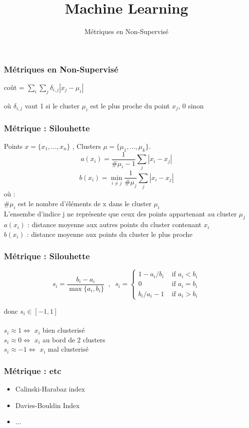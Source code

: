 \documentclass{formation}
\title{Machine Learning}
\subtitle{Métriques en Non-Supervisé}
\begin{document}
\maketitle

\begin{frame}
  \frametitle{Métriques en Non-Supervisé}
  \begin{center}
    coût = $\sum_i \sum_j \delta_{i,j}\left| x_j - \mu_i \right|$
  \end{center}
  où $\delta_{i,j}$ vaut 1 si le cluster $\mu_i$ est le plus proche du point $x_j$, 0 sinon
\end{frame}

\begin{frame}
  \frametitle{Métrique : Silouhette}
  Points $x = \{x_1, \dotsc, x_n\}$ , Clusters $\mu = \{\mu_1, \dotsc, \mu_k\}$. \\
  \[
  \boxed{a(x_i) = \frac{1}{\#\mu_i-1}\sum_j |x_i - x_j|}
  \]
  \[
  \boxed{b(x_i) = \min_{i \neq j} \frac{1}{\#\mu_j}\sum_j |x_i - x_j|}
  \]
  où : \\
  $\#\mu_i$ est le nombre d'éléments de x dans le cluster $\mu_i$ \\
  L'ensembe d'indice j ne représente que ceux des points appartenant au cluster $\mu_j$ \\
  $a(x_i)$ : distance moyenne aux autres points du cluster contenant $x_i$ \\
  $b(x_i)$ : distance moyenne aux points du cluster le plus proche
  
\end{frame}

\begin{frame}
  \frametitle{Métrique : Silouhette}
  
  \begin{center}
    \[
    s_i = \frac{b_i - a_i}{\max\{a_i, b_i\}}\;\;,\;\;
    s_i = \left\{
    \begin{array}{ll}
      1 - a_i/b_i & \mbox{ if } a_i < b_i \\[2mm]
      0 & \mbox{ if } a_i = b_i \\[2mm]
      b_i / a_i - 1 & \mbox{ if } a_i > b_i
    \end{array}\right.
    \]
    
  \end{center}
  donc $s_i \in [-1, 1]$ \\
  \\
  $s_i \approx 1 \iff$ $x_i$ bien clusterisé \\
  $s_i \approx 0 \iff$ $x_i$ au bord de 2 clusters\\
  $s_i \approx -1 \iff$ $x_i$ mal clusterisé
\end{frame}

\begin{frame}
  \frametitle{Métrique : etc}
  \begin{itemize}
  \item Calinski-Harabaz index
  \item Davies-Bouldin Index
  \item ...
  \end{itemize}
\end{frame}
\end{document}
